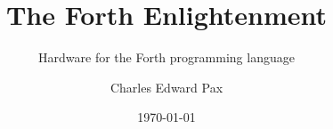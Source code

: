 \documentclass[
    letterpaper, %
	fontsize=10pt, %
	twoside=true, %
	numbers=noenddot, %
]{kaobook}
\begin{document}


\title[The Forth Enlightenment]{The Forth Enlightenment}
\subtitle{Hardware for the Forth programming language}

\author[Charles Edward Pax]{Charles Edward Pax}

\date{\today}

\publishers{Self-publishing}


\frontmatter %




%
%	
%	
%	
%	
%	
%	
%	
\end{document}
